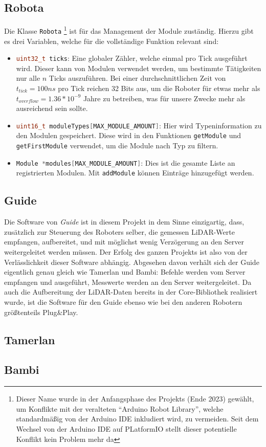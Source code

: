\subsection{Robota}
Die Klasse \texttt{Robota}%
\footnote{Dieser Name wurde in der Anfangsphase des Projekts (Ende 2023) gewählt, 
        um Konflikte mit der veralteten ``Arduino Robot Library'',
        welche standardmäßig von der Arduino IDE inkludiert wird,
        zu vermeiden.
        Seit dem Wechsel von der Arduino IDE auf PLatformIO stellt dieser potentielle Konflikt kein Problem mehr da}
ist für das Management der Module zuständig.
%
Hierzu gibt es drei Variablen, welche für die vollständige Funktion relevant sind:
\begin{itemize}
    \item \lstinline[language=c]|uint32_t ticks|:
        Eine globaler Zähler, welche einmal pro Tick ausgeführt wird.
        Dieser kann von Modulen verwendet werden, um bestimmte Tätigkeiten nur alle $n$ Ticks auszuführen.
        Bei einer durchschnittlichen Zeit von $t_{tick}=100ns$ pro Tick reichen 32 Bits aus,
        um die Roboter für etwas mehr als $t_{overflow}=1.36*10^{-9}$ Jahre zu betreiben,
        was für unsere Zwecke mehr als ausreichend sein sollte.
    \item \lstinline[language=c]|uint16_t moduleTypes[MAX_MODULE_AMOUNT]|:
        Hier wird Typeninformation zu den Modulen gespeichert.
        Diese wird in den Funktionen \texttt{getModule} und \texttt{getFirstModule} verwendet,
        um die Module nach Typ zu filtern.
    \item \lstinline[language=c]|Module *modules[MAX_MODULE_AMOUNT]|:
        Dies ist die gesamte Liste an registrierten Modulen.
        Mit \texttt{addModule} können Einträge hinzugefügt werden.
\end{itemize}

\subsection{Guide}
\label{subsec:software_guide}
Die Software von \textit{Guide} ist in diesem Projekt in dem Sinne einzigartig,
dass,
zusätzlich zur Steuerung des Roboters selber,
die gemessen LiDAR-Werte empfangen,
aufbereitet,
und mit möglichst wenig Verzögerung an den Server weitergeleitet werden müssen.
%
Der Erfolg des ganzen Projekts ist also von der Verlässlichkeit dieser Software abhängig.
%
Abgesehen davon verhält sich der Guide eigentlich genau gleich wie Tamerlan und Bambi:
%
Befehle werden vom Server empfangen und ausgeführt,
Messwerte werden an den Server weitergeleitet.
%
Da auch die Aufbereitung der LiDAR-Daten bereits in der Core-Bibliothek realisiert wurde,
ist die Software für den Guide ebenso wie bei den anderen Robotern größtenteils Plug\&Play.

\subsection{Tamerlan}
\label{subsec:software_tamerlan}

\subsection{Bambi}
\label{subsec:software_bambi}